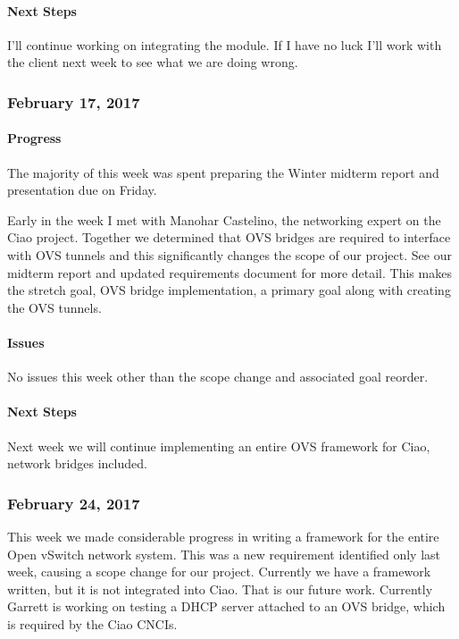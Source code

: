 \documentclass[10pt,onecolumn,journal,draftclsnofoot]{IEEEtran}
\begin{document}
\paragraph{Next Steps} 

I'll continue working on integrating the module. If I have no luck I'll
work with the client next week to see what we are doing wrong.

\subsubsection{February 17, 2017} 

\paragraph{Progress} 

The majority of this week was spent preparing the Winter midterm report
and presentation due on Friday.

Early in the week I met with Manohar Castelino, the networking expert on
the Ciao project. Together we determined that OVS bridges are required
to interface with OVS tunnels and this significantly changes the scope
of our project. See our midterm report and updated requirements document
for more detail. This makes the stretch goal, OVS bridge implementation,
a primary goal along with creating the OVS tunnels.

\paragraph{Issues} 

No issues this week other than the scope change and associated goal
reorder.

\paragraph{Next Steps} 

Next week we will continue implementing an entire OVS framework for
Ciao, network bridges included.

\subsubsection{February 24, 2017} 

This week we made considerable progress in writing a framework for the
entire Open vSwitch network system. This was a new requirement
identified only last week, causing a scope change for our project.
Currently we have a framework written, but it is not integrated into
Ciao. That is our future work. Currently Garrett is working on testing a
DHCP server attached to an OVS bridge, which is required by the Ciao
CNCIs.
\end{document}
